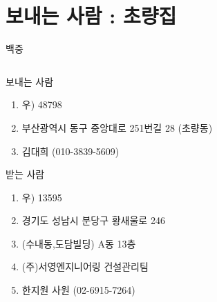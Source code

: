 \documentclass[aspectratio=1610,12pt,xcolor=pdftex,dvipsnames,table,handout]{beamer}
\begin{document}
		\section{보내는 사람 : 초량집 }
		\begin{frame}[c,plain]{백중}

		\begin{columns}[t]
		\begin{column}{0.6\textwidth}

			\begin{block} {보내는 사람}
			\begin{enumerate}
			\item [] 우) 48798
			\item [] 부산광역시 동구 중앙대로 251번길 28 (초량동)
			\item [] 김대희 (010-3839-5609)
			\end{enumerate}
			\end{block}


			\begin{block} {받는 사람}
			\begin{enumerate}
			\item [] 우) 13595
			\item [] 경기도 성남시 분당구 황새울로 246
			\item []  (수내동,도담빌딩) A동 13층
			\item [] (주)서영엔지니어링 건설관리팀
			\item [] 한지원 사원 (02-6915-7264)
			\end{enumerate}
			\end{block}

		\end{column}

		\end{columns}
		\null
		\end{frame}
\end{document}
